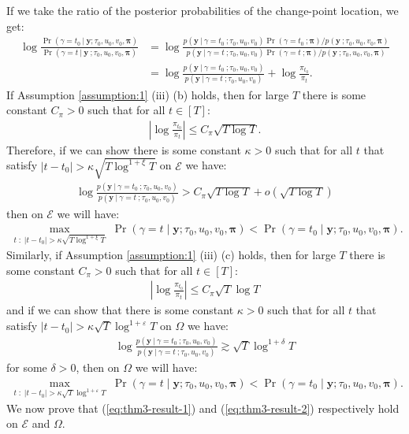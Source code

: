 If we take the ratio of the posterior probabilities of the change-point location, we get:
\begin{align*}
    \log \frac{\Pr(\gamma = t_0  \:|\: \mathbf{y} ; \tau_0, u_0, v_0,\pmb{\pi})}{\Pr(\gamma = t  \:|\: \mathbf{y} \:; \tau_0, u_0, v_0,\pmb{\pi})} &=  \log \frac{p(\mathbf{y} \:|\:\gamma = t_0 \:; \tau_0, u_0, v_0)\Pr(\gamma = t_0 \:; \pmb{\pi})/ p(\mathbf{y}\:;\tau_0, u_0, v_0,\pmb{\pi})}{p(\mathbf{y} \:|\:\gamma = t \:; \tau_0, u_0, v_0)\Pr(\gamma = t \:;\pmb{\pi})/ p(\mathbf{y}\:;\tau_0, u_0, v_0,\pmb{\pi})} \tag{Bayes' rule} \\
    &= \log \frac{p(\mathbf{y} \:|\:\gamma = t_0 \:; \tau_0, u_0, v_0)}{p(\mathbf{y} \:|\:\gamma = t \:; \tau_0, u_0, v_0)} + \log\frac{\pi_{t_0}}{\pi_t}.
\end{align*}
If Assumption \ref{assumption:1} (iii) (b) holds, then for large $T$ there is some constant $C_\pi > 0$ such that for all $t \in [T]$: 
\begin{align}\label{eq:thm3-prior-bd-1}
    \left|\log \frac{\pi_{t_0}}{\pi_t}\right| \leq C_\pi \sqrt{T \log T}.
\end{align}
Therefore, if we can show there is some constant $\kappa > 0$ such that for all $t$ that satisfy $|t - t_0| > \kappa \sqrt{T \log^{1+\xi}T}$ on $\mathcal{E}$ we have:
\begin{align}
    \log \frac{p(\mathbf{y} \:|\:\gamma = t_0 \:; \tau_0, u_0, v_0)}{p(\mathbf{y} \:|\:\gamma = t \:; \tau_0, u_0, v_0)} > C_\pi \sqrt{T \log T} + o\left(\sqrt{T \log T}\right) \label{eq:thm3-result-1}
\end{align}
then on $\mathcal{E}$ we will have:
\begin{align*}
    \max_{t \;:\; |t - t_0| > \kappa \sqrt{T\log^{1+\xi} T}} \; \Pr(\gamma = t  \;|\; \mathbf{y} ; \tau_0, u_0, v_0,\pmb{\pi}) < \Pr(\gamma = t_0  \;|\; \mathbf{y} ; \tau_0, u_0, v_0,\pmb{\pi}).
\end{align*}
Similarly, if Assumption \ref{assumption:1} (iii) (c) holds, then for large $T$ there is some constant $C_\pi > 0$ such that for all $t \in [T]$: 
\begin{align}\label{eq:thm3-prior-bd-1}
    \left|\log \frac{\pi_{t_0}}{\pi_t}\right| \leq C_\pi \sqrt{T}\log T
\end{align}
and if we can show that there is some constant $\kappa > 0$ such that for all $t$ that satisfy $|t - t_0| > \kappa\sqrt{T}\log^{1+\varepsilon} T$ on $\Omega$ we have:
\begin{align}
    \log \frac{p(\mathbf{y} \:|\:\gamma = t_0 \:; \tau_0, u_0, v_0)}{p(\mathbf{y} \:|\:\gamma = t \:; \tau_0, u_0, v_0)}\gtrsim \sqrt{T}\log^{1+\delta} T \label{eq:thm3-result-2}
\end{align}
for some $\delta > 0$, then on $\Omega$ we will have:
\begin{align*}
    \max_{t \;:\; |t - t_0| > \kappa \sqrt{T}\log^{1+\varepsilon} T} \; \Pr(\gamma = t  \;|\; \mathbf{y} ; \tau_0, u_0, v_0,\pmb{\pi}) < \Pr(\gamma = t_0  \;|\; \mathbf{y} ; \tau_0, u_0, v_0,\pmb{\pi}).
\end{align*}
We now prove that (\ref{eq:thm3-result-1}) and (\ref{eq:thm3-result-2}) respectively hold on $\mathcal{E}$ and $\Omega$.

